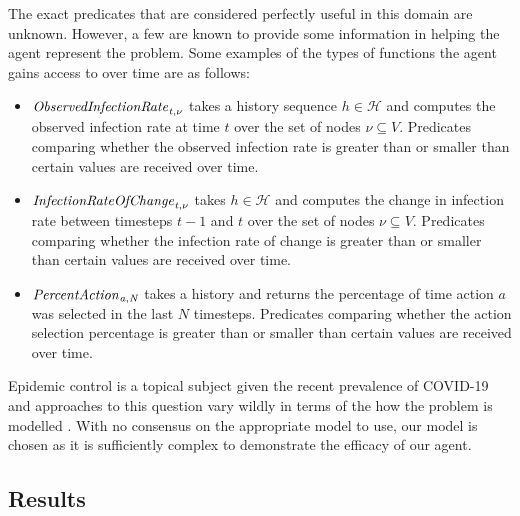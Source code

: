 \documentclass[letterpaper]{article} %
\newcommand {\Hist}{\mathcal{H}}
\theoremstyle{definition}
\begin{document}
The exact predicates that are considered perfectly useful in this domain are unknown. However, a few are known to provide some information in helping the agent represent the problem. Some examples of the types of functions the agent gains access to over time are as follows:
\begin{itemize}
    \item $\it{ObservedInfectionRate}_{t, \nu}$ takes a history sequence $h \in \Hist$ and computes the observed infection rate at time $t$ over the set of nodes $\nu \subseteq V$. Predicates comparing whether the observed infection rate is greater than or smaller than certain values are received over time.
    \item $\it{InfectionRateOfChange}_{t, \nu}$ takes $h \in \Hist$ and computes the change in infection rate between timesteps $t-1$ and $t$ over the set of nodes $\nu \subseteq V$. Predicates comparing whether the infection rate of change is greater than or smaller than certain values are received over time.
    \item $\it{PercentAction}_{a, N}$ takes a history and returns the percentage of time action $a$ was selected in the last $N$ timesteps. Predicates comparing whether the action selection percentage is greater than or smaller than certain values are received over time. 
\end{itemize}

Epidemic control is a topical subject given the recent prevalence of COVID-19 and approaches to this question vary wildly in terms of the how the problem is modelled \cite{ArPe20,CELT20,CHRTOMP20,Brauer:2012,Anderson:2013,BKSE21}.
With no consensus on the appropriate model to use, our model is chosen as it is sufficiently complex to demonstrate the efficacy of our agent. 


\subsection{Results}
\end{document}
